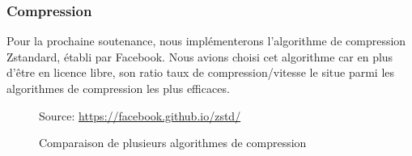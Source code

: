 \documentclass[11pt, a4paper]{report}
\newcommand*{\surl}[1]{{\bodyfont\color{clearocean}\selectfont\url{#1}}}
\begin{document}
\clearpage

      \subsubsection{Compression}
        Pour la prochaine soutenance, nous implémenterons l'algorithme de compression Zstandard, établi par Facebook. Nous avions choisi cet algorithme car en plus d'être en licence libre, son ratio taux de compression/vitesse le situe parmi les algorithmes de compression les plus efficaces.
    
        \begin{figure}[H]
          \centering
            \caption{Comparaison de plusieurs algorithmes de compression}
          \footnotesize{Source: \surl{https://facebook.github.io/zstd/}}
          \label{fig:zstd_comparison}
        \end{figure}
    
\end{document}
